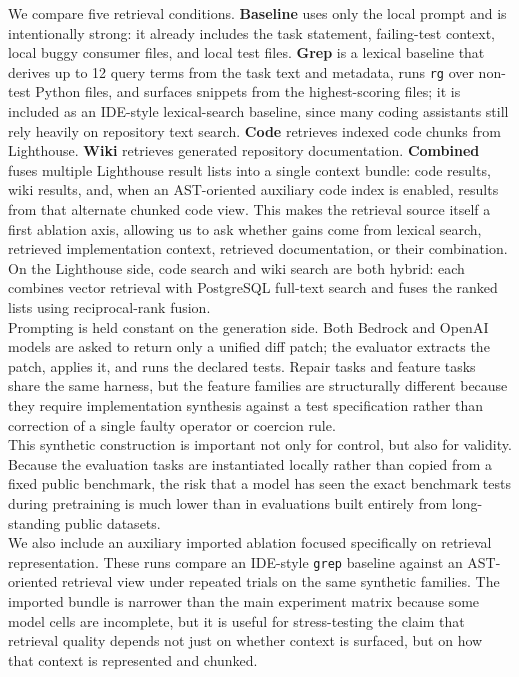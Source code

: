 \documentclass[a4paper,12pt]{article}
\begin{document}
We compare five retrieval conditions. \textbf{Baseline} uses only the local prompt and is intentionally strong: it already includes the task statement, failing-test context, local buggy consumer files, and local test files. \textbf{Grep} is a lexical baseline that derives up to 12 query terms from the task text and metadata, runs \texttt{rg} over non-test Python files, and surfaces snippets from the highest-scoring files; it is included as an IDE-style lexical-search baseline, since many coding assistants still rely heavily on repository text search. \textbf{Code} retrieves indexed code chunks from Lighthouse. \textbf{Wiki} retrieves generated repository documentation. \textbf{Combined} fuses multiple Lighthouse result lists into a single context bundle: code results, wiki results, and, when an AST-oriented auxiliary code index is enabled, results from that alternate chunked code view. This makes the retrieval source itself a first ablation axis, allowing us to ask whether gains come from lexical search, retrieved implementation context, retrieved documentation, or their combination. On the Lighthouse side, code search and wiki search are both hybrid: each combines vector retrieval with PostgreSQL full-text search and fuses the ranked lists using reciprocal-rank fusion.\\

Prompting is held constant on the generation side. Both Bedrock and OpenAI models are asked to return only a unified diff patch; the evaluator extracts the patch, applies it, and runs the declared tests. Repair tasks and feature tasks share the same harness, but the feature families are structurally different because they require implementation synthesis against a test specification rather than correction of a single faulty operator or coercion rule.\\

This synthetic construction is important not only for control, but also for validity. Because the evaluation tasks are instantiated locally rather than copied from a fixed public benchmark, the risk that a model has seen the exact benchmark tests during pretraining is much lower than in evaluations built entirely from long-standing public datasets.\\

We also include an auxiliary imported ablation focused specifically on retrieval representation. These runs compare an IDE-style \texttt{grep} baseline against an AST-oriented retrieval view under repeated trials on the same synthetic families. The imported bundle is narrower than the main experiment matrix because some model cells are incomplete, but it is useful for stress-testing the claim that retrieval quality depends not just on whether context is surfaced, but on how that context is represented and chunked.\\
\end{document}
